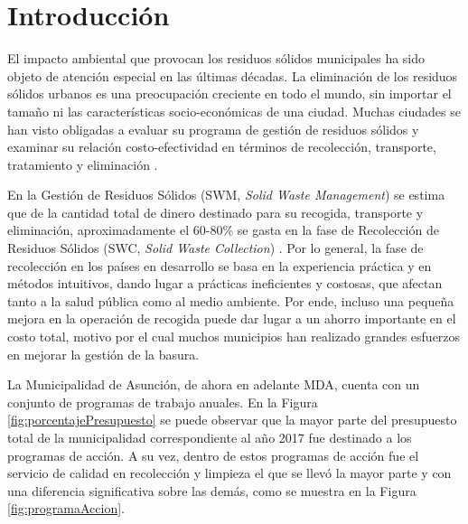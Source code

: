 \chapter{Introducción}
\label{chap1}
\ifpdf
  \graphicspath{{Chapter1/Chapter1Figs/PNG/}{Chapter1/Chapter1Figs/PDF/}{Chapter1/Chapter1Figs/}}
\else
  \graphicspath{{Chapter1/Chapter1Figs/EPS/}{Chapter1/Chapter1Figs/}}
\fi


El impacto ambiental que provocan los residuos sólidos municipales ha sido objeto de atención especial en las últimas décadas. La eliminación de los residuos sólidos urbanos es una preocupación creciente en todo el mundo, sin importar el tamaño ni las características socio-económicas de una ciudad. Muchas ciudades se han visto obligadas a evaluar su programa de gestión de residuos sólidos y examinar su relación costo-efectividad en términos de recolección, transporte, tratamiento y eliminación \citep{Karadimas2007OptimalAlgorithm}.

En la Gestión de Residuos Sólidos (SWM, \textit{Solid Waste Management}) se estima que de la cantidad total de dinero destinado para su recogida, transporte y eliminación, aproximadamente el 60-80\% se gasta en la fase de Recolección de Residuos Sólidos (SWC, \textit{Solid Waste Collection}) \citep{Tavares2009OptimisationModelling,Dogan2003Report:Istanbul}. Por lo general, la fase de recolección en los países en desarrollo se basa en la experiencia práctica y en métodos intuitivos, dando lugar a prácticas ineficientes y costosas, que afectan tanto a la salud pública como al medio ambiente. Por ende, incluso una pequeña mejora en la operación de recogida puede dar lugar a un ahorro importante en el costo total, motivo por el cual muchos municipios han realizado grandes esfuerzos en mejorar la gestión de la basura.

La Municipalidad de Asunción, de ahora en adelante MDA, cuenta con un conjunto de programas de trabajo anuales. En la Figura \ref{fig:porcentajePresupuesto} se puede observar que la mayor parte del presupuesto total de la municipalidad correspondiente al año 2017 fue destinado a los programas de acción. A su vez, dentro de estos programas de acción fue el servicio de calidad en recolección y limpieza el que se llevó la mayor parte y con una diferencia significativa sobre las demás, como se muestra en la Figura \ref{fig:programaAccion}.

